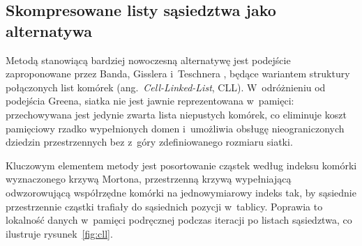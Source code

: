 \subsection{Skompresowane listy sąsiedztwa jako alternatywa}

Metodą stanowiącą bardziej nowoczesną alternatywę jest podejście zaproponowane
przez Banda, Gisslera i~Teschnera \cite{band2019compressed}, będące wariantem
struktury połączonych list komórek (ang.~\textit{Cell-Linked-List}, CLL).
W~odróżnieniu od podejścia Greena, siatka nie jest jawnie reprezentowana
w~pamięci: przechowywana jest jedynie zwarta lista niepustych komórek, co eliminuje
koszt pamięciowy rzadko wypełnionych domen i~umożliwia obsługę nieograniczonych
dziedzin przestrzennych bez z~góry zdefiniowanego rozmiaru siatki.

Kluczowym elementem metody jest posortowanie cząstek według indeksu komórki
wyznaczonego krzywą Mortona, przestrzenną krzywą wypełniającą odwzorowującą
współrzędne komórki na jednowymiarowy indeks tak, by sąsiednie przestrzennie
cząstki trafiały do sąsiednich pozycji w~tablicy. Poprawia to lokalność danych
w~pamięci podręcznej podczas iteracji po listach sąsiedztwa, co ilustruje
rysunek~\ref{fig:cll}.

